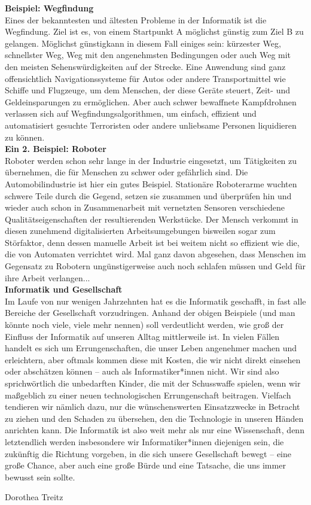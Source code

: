 {\vspace{3mm}


\textbf{Beispiel: Wegfindung}\\
Eines der bekanntesten und ältesten Probleme in der Informatik ist die Wegfindung. Ziel ist es, von einem Startpunkt A möglichst günstig zum Ziel B zu gelangen. \glqq Möglichst günstig\grqq kann in diesem Fall einiges sein: kürzester Weg, schnellster Weg, Weg mit den angenehmsten Bedingungen oder auch Weg mit den meisten Sehenswürdigkeiten auf der Strecke. Eine Anwendung sind ganz offensichtlich Navigationssysteme für Autos oder andere Transportmittel wie Schiffe und Flugzeuge, um dem Menschen, der diese Geräte steuert, Zeit- und Geldeinsparungen zu ermöglichen. Aber auch schwer bewaffnete Kampfdrohnen verlassen sich auf Wegfindungsalgorithmen, um einfach, effizient und automatisiert gesuchte Terroristen oder andere unliebsame Personen liquidieren zu können.\\

\textbf{Ein 2. Beispiel: Roboter}\\
Roboter werden schon sehr lange in der Industrie eingesetzt, um Tätigkeiten zu übernehmen, die für Menschen zu schwer oder gefährlich sind. Die Automobilindustrie ist hier ein gutes Beispiel. Stationäre Roboterarme wuchten schwere Teile durch die Gegend, setzen sie zusammen und überprüfen hin und wieder auch schon in Zusammenarbeit mit vernetzten Sensoren verschiedene Qualitätseigenschaften der resultierenden Werkstücke. Der Mensch verkommt in diesen zunehmend digitalisierten Arbeitsumgebungen bisweilen sogar zum Störfaktor, denn dessen manuelle Arbeit ist bei weitem nicht so effizient wie die, die von Automaten verrichtet wird. Mal ganz davon abgesehen, dass Menschen im Gegensatz zu Robotern ungünstigerweise auch noch schlafen müssen und Geld für ihre Arbeit verlangen...\\

\textbf{Informatik und Gesellschaft}\\
Im Laufe von nur wenigen Jahrzehnten hat es die Informatik geschafft, in fast alle Bereiche der Gesellschaft vorzudringen. Anhand der obigen Beispiele (und man könnte noch viele, viele mehr nennen) soll verdeutlicht werden, wie groß der Einfluss der Informatik auf unseren Alltag mittlerweile ist. In vielen Fällen handelt es sich um Errungenschaften, die unser Leben angenehmer machen und erleichtern, aber oftmals kommen diese mit Kosten, die wir nicht direkt einsehen oder abschätzen können -- auch als Informatiker*innen nicht. Wir sind also sprichwörtlich die unbedarften Kinder, die mit der Schusswaffe spielen, wenn wir maßgeblich zu einer neuen technologischen Errungenschaft beitragen. Vielfach tendieren wir nämlich dazu, nur die wünschenswerten Einsatzzwecke in Betracht zu ziehen und den Schaden zu übersehen, den die Technologie in unseren Händen anrichten kann. Die Informatik ist also weit mehr als nur eine Wissenschaft, denn letztendlich werden insbesondere wir Informatiker*innen diejenigen sein, die zukünftig die Richtung vorgeben, in die sich unsere Gesellschaft bewegt -- eine große Chance, aber auch eine große Bürde und eine Tatsache, die uns immer bewusst sein sollte.}
{Dorothea Treitz}

\vspace{2mm}


\newpage
